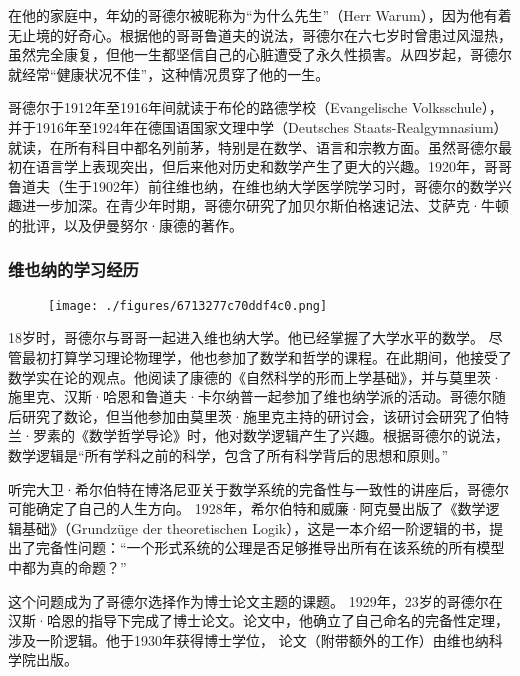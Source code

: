在他的家庭中，年幼的哥德尔被昵称为“为什么先生”（Herr Warum），因为他有着无止境的好奇心。根据他的哥哥鲁道夫的说法，哥德尔在六七岁时曾患过风湿热，虽然完全康复，但他一生都坚信自己的心脏遭受了永久性损害。从四岁起，哥德尔就经常“健康状况不佳”，这种情况贯穿了他的一生。

哥德尔于1912年至1916年间就读于布伦的路德学校（Evangelische Volksschule），并于1916年至1924年在德国语国家文理中学（Deutsches Staats-Realgymnasium）就读，在所有科目中都名列前茅，特别是在数学、语言和宗教方面。虽然哥德尔最初在语言学上表现突出，但后来他对历史和数学产生了更大的兴趣。1920年，哥哥鲁道夫（生于1902年）前往维也纳，在维也纳大学医学院学习时，哥德尔的数学兴趣进一步加深。在青少年时期，哥德尔研究了加贝尔斯伯格速记法、艾萨克·牛顿的批评，以及伊曼努尔·康德的著作。
\subsubsection{维也纳的学习经历}
\begin{figure}[ht]
\centering
\texttt{[image: ./figures/6713277c70ddf4c0.png]}
\caption{} \label{fig_KRT_2}
\end{figure}
18岁时，哥德尔与哥哥一起进入维也纳大学。他已经掌握了大学水平的数学。 尽管最初打算学习理论物理学，他也参加了数学和哲学的课程。在此期间，他接受了数学实在论的观点。他阅读了康德的《自然科学的形而上学基础》，并与莫里茨·施里克、汉斯·哈恩和鲁道夫·卡尔纳普一起参加了维也纳学派的活动。哥德尔随后研究了数论，但当他参加由莫里茨·施里克主持的研讨会，该研讨会研究了伯特兰·罗素的《数学哲学导论》时，他对数学逻辑产生了兴趣。根据哥德尔的说法，数学逻辑是“所有学科之前的科学，包含了所有科学背后的思想和原则。”

听完大卫·希尔伯特在博洛尼亚关于数学系统的完备性与一致性的讲座后，哥德尔可能确定了自己的人生方向。 1928年，希尔伯特和威廉·阿克曼出版了《数学逻辑基础》（Grundzüge der theoretischen Logik），这是一本介绍一阶逻辑的书，提出了完备性问题：“一个形式系统的公理是否足够推导出所有在该系统的所有模型中都为真的命题？”

这个问题成为了哥德尔选择作为博士论文主题的课题。 1929年，23岁的哥德尔在汉斯·哈恩的指导下完成了博士论文。论文中，他确立了自己命名的完备性定理，涉及一阶逻辑。他于1930年获得博士学位， 论文（附带额外的工作）由维也纳科学院出版。